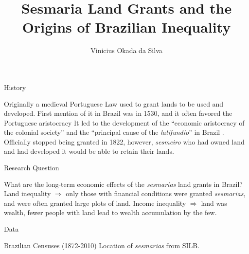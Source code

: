 \documentclass[aspectratio=1610]{beamer}
\title{Sesmaria Land Grants and the Origins of Brazilian Inequality}
\author{Vinicius Okada da Silva}
\institute{University of Illinois at Urbana-Champaign}
\date{}
\begin{document}
\begin{frame}
	\titlepage
\end{frame}

\begin{frame}{History}
    \begin{outline}
        \1 Originally a medieval Portuguese Law used to grant lands to be used and developed.
        \1 First mention of it in Brazil was in 1530, and it often favored the Portuguese aristocracy \parencite{Lobb1976-mc}
            \2 It led to the development of the ``economic aristocracy of the colonial society'' and the ``principal cause of the \textit{latifundio}'' in Brazil \parencites[p.~36]{Lima2002-kd}[p.~48]{Da_Costa_Porto1979-dz}.
            \2 Officially stopped being granted in 1822, however, \textit{sesmeiro} who had owned land and had developed it would be able to retain their lands.
    \end{outline}    
\end{frame}

\begin{frame}{Research Question}
    \begin{outline}
        \1 What are the long-term economic effects of the \textit{sesmarias} land grants in Brazil?
            \2 Land inequality $\Rightarrow$ only those with financial conditions were granted \textit{sesmarias}, and were often granted large plots of land.
            \2 Income inequality $\Rightarrow$ land was wealth, fewer people with land lead to wealth accumulation by the few.
    \end{outline}
\end{frame}

\begin{frame}{Data}
    \begin{outline}
        \1 Brazilian Censuses (1872-2010)
        \1 Location of \textit{sesmarias} from SILB.
    \end{outline}
\end{frame}
\end{document}
